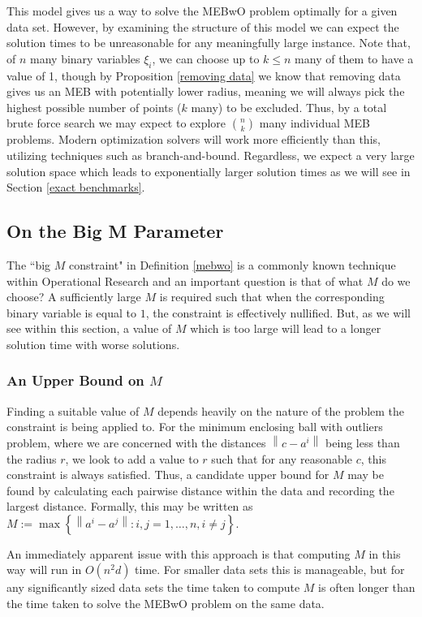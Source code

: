 \documentclass[11pt,twoside]{report}
\newcommand{\norm}[1]{\left\lVert#1\right\rVert} %
\theoremstyle{definition}
\numberwithin{theorem}{section}
\numberwithin{definition}{section}
\numberwithin{lemma}{section}
\numberwithin{proposition}{section}
\numberwithin{equation}{section}
\numberwithin{figure}{section}
\begin{document}
This model gives us a way to solve the MEBwO problem optimally for a given data set. However, by examining the structure of this model we can expect the solution times to be unreasonable for any meaningfully large instance. Note that, of $n$ many binary variables $\xi_i$, we can choose up to $k\leq n$ many of them to have a value of 1, though by Proposition \ref{removing data} we know that removing data gives us an MEB with potentially lower radius, meaning we will always pick the highest possible number of points ($k$ many) to be excluded. Thus, by a total brute force search we may expect to explore $\binom{n}{k}$ many individual MEB problems. Modern optimization solvers will work more efficiently than this, utilizing techniques such as branch-and-bound. Regardless, we expect a very large solution space which leads to exponentially larger solution times as we will see in Section \ref{exact benchmarks}.


\subsection{On the Big M Parameter}
The ``big $M$ constraint" in Definition \ref{mebwo} is a commonly known technique within Operational Research and an important question is that of what $M$ do we choose? A sufficiently large $M$ is required such that when the corresponding binary variable is equal to $1$, the constraint is effectively nullified. But, as we will see within this section, a value of $M$ which is too large will lead to a longer solution time with worse solutions.

\subsubsection{An Upper Bound on $M$}
Finding a suitable value of $M$ depends heavily on the nature of the problem the constraint is being applied to. For the minimum enclosing ball with outliers problem, where we are concerned with the distances $\norm{c-a^i}$ being less than the radius $r$, we look to add a value to $r$ such that for any reasonable $c$, this constraint is always satisfied. Thus, a candidate upper bound for $M$ may be found by calculating each pairwise distance within the data and recording the largest distance. Formally, this may be written as $M:= \max\left\{\norm{a^i-a^j}: i,j = 1,\ldots,n, i\neq j\right\}$.

An immediately apparent issue with this approach is that computing $M$ in this way will run in $O(n^2d)$ time. For smaller data sets this is manageable, but for any significantly sized data sets the time taken to compute $M$ is often longer than the time taken to solve the MEBwO problem on the same data.
\end{document}
